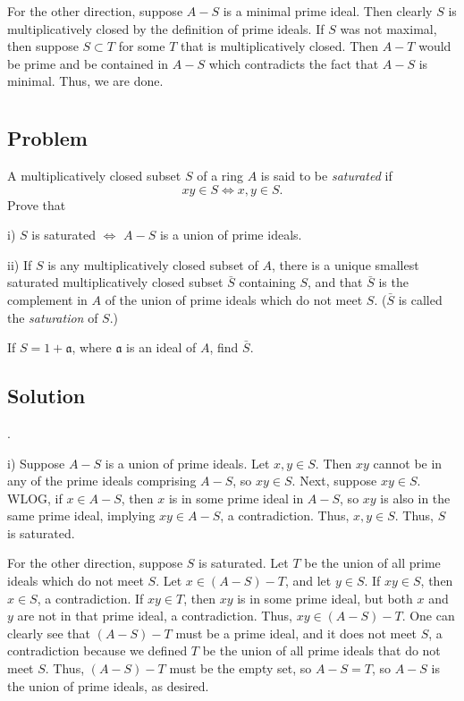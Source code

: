 \documentclass[book,12pt,oneside,openany]{memoir}
\begin{document}
For the other direction, suppose $A-S$ is a minimal prime ideal. Then clearly $S$ is multiplicatively closed by the definition of prime ideals. If $S$ was not maximal, then suppose $S \subset T$ for some $T$ that is multiplicatively closed. Then $A - T$ would be prime and be contained in $A - S$ which contradicts the fact that $A-S$ is minimal. Thus, we are done.

\section{}
\subsection{Problem}
A multiplicatively closed subset $S$ of a ring $A$ is said to be \emph{saturated} if \[xy \in S \Leftrightarrow x,y \in S.\]
Prove that 

i) $S$ is saturated $\Leftrightarrow$ $A - S$ is a union of prime ideals.

ii) If $S$ is any multiplicatively closed subset of $A$, there is a unique smallest saturated multiplicatively closed subset $\bar{S}$ containing $S$, and that $\bar{S}$ is the complement in $A$ of the union of prime ideals which do not meet $S$. ($\bar{S}$ is called the \emph{saturation} of $S$.)

If $S = 1 + \mathfrak{a}$, where $\mathfrak{a}$ is an ideal of $A$, find $\bar{S}$.

\subsection{Solution}
.

i) Suppose $A-S$ is a union of prime ideals. Let $x,y \in S$. Then $xy$ cannot be in any of the prime ideals comprising $A-S$, so $xy \in S$. Next, suppose $xy \in S$. WLOG, if $x \in A - S$, then $x$ is in some prime ideal in $A-S$, so $xy $ is also in the same prime ideal, implying $xy \in A - S$, a contradiction. Thus, $x,y \in S$. Thus, $S$ is saturated.

For the other direction, suppose $S$ is saturated. Let $T$ be the union of all prime ideals which do not meet $S$. Let $x \in (A - S) - T$, and let $y \in S$. If $xy \in S$, then $x \in S$, a contradiction. If $xy \in T$, then $xy$ is in some prime ideal, but both $x$ and $y$ are not in that prime ideal, a contradiction. Thus, $xy \in (A-S) - T$. One can clearly see that $(A-S) - T$ must be a prime ideal, and it does not meet $S$, a contradiction because we defined $T$ be the union of all prime ideals that do not meet $S$. Thus, $(A-S)-T$ must be the empty set, so $A-S = T$, so $A-S$ is the union of prime ideals, as desired.
\end{document}
